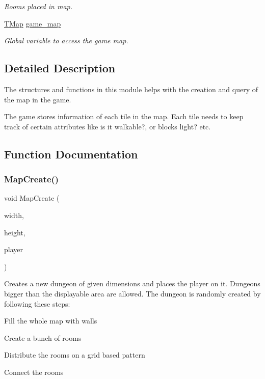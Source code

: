 \begin{DoxyCompactItemize}
\begin{DoxyCompactList}\small\item\em Rooms placed in map. \end{DoxyCompactList}\item 
\mbox{\hyperlink{structTMap}{T\+Map}} \mbox{\hyperlink{group__GameMap_ga6c049bed6e4286fab8db7b65f4d8f871}{game\+\_\+map}}
\begin{DoxyCompactList}\small\item\em Global variable to access the game map. \end{DoxyCompactList}\end{DoxyCompactItemize}


\subsection{Detailed Description}
The structures and functions in this module helps with the creation and query of the map in the game.

The game stores information of each tile in the map. Each tile needs to keep track of certain attributes like is it walkable?, or blocks light? etc. 

\subsection{Function Documentation}
\mbox{\label{group__GameMap_ga0a25d4a00a01f6a01f415c8cf22b17d2}} 
\subsubsection{\texorpdfstring{MapCreate()}{MapCreate()}}
{\footnotesize\ttfamily void Map\+Create (\begin{DoxyParamCaption}\item[{u8}]{width,  }\item[{u8}]{height,  }\item[{\mbox{\hyperlink{structTEntity}{T\+Entity}} $\ast$}]{player }\end{DoxyParamCaption})}

Creates a new dungeon of given dimensions and places the player on it. Dungeons bigger than the displayable area are allowed. The dungeon is randomly created by following these steps\+:
\begin{DoxyItemize}
\item Fill the whole map with walls
\item Create a bunch of rooms
\item Distribute the rooms on a grid based pattern
\item Connect the rooms
\end{DoxyItemize}


